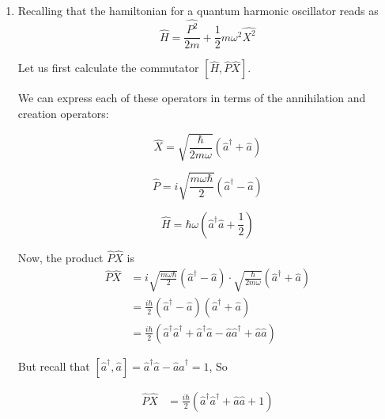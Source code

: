 \documentclass[twoside]{article}
\begin{document}
\begin{enumerate}
   \item Recalling that the hamiltonian for a quantum harmonic oscillator reads as
   \[ \hat{H} = \frac{\hat{P^2}}{2m} + \frac{1}{2} m\omega^2 \hat{X^2} \]

   Let us first calculate the commutator $\left[\hat{H}, \hat{P}\hat{X} \right]$.

   We can express each of these operators in terms of the annihilation and creation operators:

   \[ \hat{X} = \sqrt{\frac{\hbar}{2 m \omega}} \left( \hat{a}^{\dagger} + \hat{a} \right)\] 

   \[ \hat{P} = i \sqrt{\frac{m\omega\hbar}{2}} \left( \hat{a}^{\dagger} - \hat{a} \right) \]

   \[ \hat{H} = \hbar\omega\left(\hat{a}^{\dagger}\hat{a} + \frac{1}{2}\right)\]

   Now, the product $\hat{P}\hat{X}$ is 
   \begin{align*}
      \hat{P}\hat{X} &= i \sqrt{\frac{m\omega\hbar}{2}} \left( \hat{a}^{\dagger} - \hat{a} \right) \cdot \sqrt{\frac{\hbar}{2 m \omega}} \left( \hat{a}^{\dagger} + \hat{a} \right) \\
      &= \frac{i\hbar}{2} \left( \hat{a}^{\dagger} - \hat{a} \right) \left( \hat{a}^{\dagger} + \hat{a} \right) \\
      &= \frac{i\hbar}{2} \left( \hat{a}^{\dagger}\hat{a}^{\dagger} + \hat{a}^{\dagger}\hat{a} - \hat{a}\hat{a}^{\dagger} + \hat{a}\hat{a}\right)
   \end{align*}

   But recall that $[\hat{a}^{\dagger}, \hat{a}] = \hat{a}^{\dagger}\hat{a} - \hat{a}\hat{a}^{\dagger} = 1$, So

   \begin{align*}
      \hat{P}\hat{X} &= \frac{i\hbar}{2} \left( \hat{a}^{\dagger}\hat{a}^{\dagger} + \hat{a}\hat{a} + 1 \right)
   \end{align*}





\end{enumerate}
\end{document}
